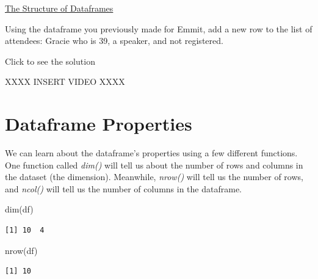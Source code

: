 \documentclass[
  letterpaper,
  DIV=11,
  numbers=noendperiod]{scrreprt}
\newenvironment{Shaded}{\begin{snugshade}}{\end{snugshade}}
\newcommand{\FunctionTok}[1]{\textcolor[rgb]{0.28,0.35,0.67}{#1}}
\newcommand{\NormalTok}[1]{\textcolor[rgb]{0.00,0.23,0.31}{#1}}
\begin{document}
\begin{watch}{}{}
    \href{https://youtu.be/0BlLEFou1kM}{The Structure of Dataframes}
\end{watch}

\begin{tcolorbox}[enhanced jigsaw, colframe=quarto-callout-tip-color-frame, colback=white, breakable, rightrule=.15mm, title=\textcolor{quarto-callout-tip-color}{\faLightbulb}\hspace{0.5em}{Try it Out}, bottomtitle=1mm, toptitle=1mm, titlerule=0mm, left=2mm, coltitle=black, colbacktitle=quarto-callout-tip-color!10!white, leftrule=.75mm, opacitybacktitle=0.6, bottomrule=.15mm, opacityback=0, arc=.35mm, toprule=.15mm]

Using the dataframe you previously made for Emmit, add a new row to the
list of attendees: Gracie who is 39, a speaker, and not registered.

Click to see the solution

XXXX INSERT VIDEO XXXX

\end{tcolorbox}

\section{Dataframe Properties}\label{dataframe-properties}

We can learn about the dataframe's properties using a few different
functions. One function called \emph{dim()} will tell us about the
number of rows and columns in the dataset (the dimension). Meanwhile,
\emph{nrow()} will tell us the number of rows, and \emph{ncol()} will
tell us the number of columns in the dataframe.

\begin{Shaded}
\begin{Highlighting}[]
\FunctionTok{dim}\NormalTok{(df)}
\end{Highlighting}
\end{Shaded}

\begin{verbatim}
[1] 10  4
\end{verbatim}

\begin{Shaded}
\begin{Highlighting}[]
\FunctionTok{nrow}\NormalTok{(df)}
\end{Highlighting}
\end{Shaded}

\begin{verbatim}
[1] 10
\end{verbatim}
\end{document}
